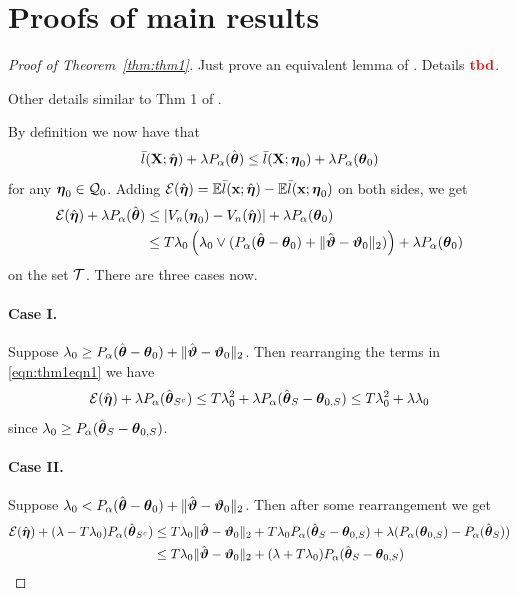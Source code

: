 \documentclass[11pt,letterpaper]{article}
\DeclareMathOperator*{\rtbd}{{\colrbf tbd}}
\numberwithin{equation}{section}
\begin{document}
\section{Proofs of main results}

\begin{proof}[Proof of Theorem~\ref{thm:thm1}]
Just prove an equivalent lemma of \cite{StadlerEtal10}. Details $\rtbd$.

Other details similar to Thm 1 of \cite{StadlerEtal10}.

By definition we now have that
$$
\bar l({\mathbf{X}}; \hat {{\boldsymbol{\eta}}}) + \lambda P_\alpha (\hat {{\boldsymbol{\theta}}}) \leq
\bar l({\mathbf{X}}; {\boldsymbol{\eta}}_0) + \lambda P_\alpha ({\boldsymbol{\theta}}_0)
$$
%
for any ${\boldsymbol{\eta}}_0 \in {\cal{Q}}_0$. Adding ${\cal{E}}(\hat {{\boldsymbol{\eta}}}) = {\mathbb{E}} \bar l({\bf{x}}; \hat {{\boldsymbol{\eta}}}) - {\mathbb{E}} \bar l({\bf{x}}; {\boldsymbol{\eta}}_0)$ on both sides, we get
%
\begin{align}
{\cal{E}}(\hat {{\boldsymbol{\eta}}}) + \lambda P_\alpha (\hat {{\boldsymbol{\theta}}}) & \leq
|V_n({\boldsymbol{\eta}}_0) - V_n(\hat {{\boldsymbol{\eta}}})| + \lambda P_\alpha ({\boldsymbol{\theta}}_0) \notag \\
& \leq T \lambda_0 \left( \lambda_0 \vee (P_\alpha (\hat {{\boldsymbol{\theta}}} - {\boldsymbol{\theta}}_0 ) +
\| \hat {{\boldsymbol{\vartheta}}} - {\boldsymbol{\vartheta}}_0 \|_2) \right) + \lambda P_\alpha ({\boldsymbol{\theta}}_0) \label{eqn:thm1eqn1}
\end{align}
%
on the set ${\cal{T}}$. There are three cases now.

\paragraph{Case I.} Suppose $\lambda_0 \geq P_\alpha (\hat {{\boldsymbol{\theta}}} - {\boldsymbol{\theta}}_0) + \| \hat {{\boldsymbol{\vartheta}}} - {\boldsymbol{\vartheta}}_0 \|_2$. Then rearranging the terms in \eqref{eqn:thm1eqn1} we have
%
$$
{\cal{E}}(\hat {{\boldsymbol{\eta}}}) + \lambda P_\alpha (\hat {{\boldsymbol{\theta}}}_{S^c}) \leq
T \lambda_0^2 + \lambda P_\alpha (\hat {{\boldsymbol{\theta}}}_S - {\boldsymbol{\theta}}_{0,S} )
\leq T \lambda_0^2 + \lambda \lambda_0
$$
%
since $\lambda_0 \geq P_\alpha (\hat {{\boldsymbol{\theta}}}_S - {\boldsymbol{\theta}}_{0,S} )$.

\paragraph{Case II.} Suppose $\lambda_0 < P_\alpha (\hat {{\boldsymbol{\theta}}} - {\boldsymbol{\theta}}_0) + \| \hat {{\boldsymbol{\vartheta}}} - {\boldsymbol{\vartheta}}_0 \|_2$. Then after some rearrangement we get
%
\begin{align*}
{\cal{E}}(\hat {{\boldsymbol{\eta}}}) + (\lambda - T\lambda_0) P_\alpha (\hat {{\boldsymbol{\theta}}}_{S^c}) & \leq
T\lambda_0 \| \hat {{\boldsymbol{\vartheta}}} - {\boldsymbol{\vartheta}}_0 \|_2 + T\lambda_0 P_\alpha (\hat {{\boldsymbol{\theta}}}_S - {\boldsymbol{\theta}}_{0,S} ) +
\lambda (P_\alpha ({\boldsymbol{\theta}}_{0,S}) - P_\alpha (\hat {{\boldsymbol{\theta}}}_S))\\
& \leq T\lambda_0 \| \hat {{\boldsymbol{\vartheta}}} - {\boldsymbol{\vartheta}}_0 \|_2 + (\lambda + T \lambda_0) P_\alpha (\hat {{\boldsymbol{\theta}}}_S - {\boldsymbol{\theta}}_{0,S} )
\end{align*}
\end{proof}
\end{document}
